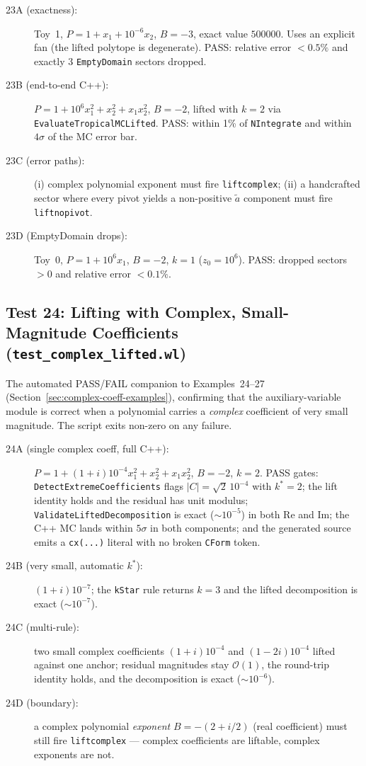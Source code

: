 \documentclass[11pt,a4paper]{article}
\begin{document}
\begin{description}
  \item[23A (exactness):] Toy~1, $P = 1 + x_1 + 10^{-6} x_2$, $B = -3$, exact value $500000$. Uses an explicit fan (the lifted polytope is degenerate). PASS: relative error $< 0.5\%$ and exactly 3 \texttt{EmptyDomain} sectors dropped.
  \item[23B (end-to-end C++):] $P = 1 + 10^6 x_1^2 + x_2^2 + x_1 x_2^2$, $B = -2$, lifted with $k = 2$ via \texttt{EvaluateTropicalMCLifted}. PASS: within 1\% of \texttt{NIntegrate} and within $4\sigma$ of the MC error bar.
  \item[23C (error paths):] (i) complex polynomial exponent must fire \texttt{liftcomplex}; (ii) a handcrafted sector where every pivot yields a non-positive $\tilde{a}$ component must fire \texttt{liftnopivot}.
  \item[23D (EmptyDomain drops):] Toy~0, $P = 1 + 10^6 x_1$, $B = -2$, $k = 1$ ($z_0 = 10^6$). PASS: dropped sectors $> 0$ and relative error $< 0.1\%$.
\end{description}

\subsection{Test 24: Lifting with Complex, Small-Magnitude Coefficients (\texttt{test\_complex\_lifted.wl})}\label{sec:test24}

The automated PASS/FAIL companion to Examples~24--27 (Section~\ref{sec:complex-coeff-examples}), confirming that the auxiliary-variable module is correct when a polynomial carries a \emph{complex} coefficient of very small magnitude. The script exits non-zero on any failure.

\begin{description}
  \item[24A (single complex coeff, full C++):] $P = 1 + (1{+}i)10^{-4} x_1^2 + x_2^2 + x_1 x_2^2$, $B = -2$, $k = 2$. PASS gates: \texttt{DetectExtremeCoefficients} flags $|C| = \sqrt{2}\,10^{-4}$ with $k^{*} = 2$; the lift identity holds and the residual has unit modulus; \texttt{ValidateLiftedDecomposition} is exact ($\sim$$10^{-5}$) in both Re and Im; the C++ MC lands within $5\sigma$ in both components; and the generated source emits a \texttt{cx(...)} literal with no broken \texttt{CForm} token.
  \item[24B (very small, automatic $k^{*}$):] $(1{+}i)10^{-7}$; the \texttt{kStar} rule returns $k = 3$ and the lifted decomposition is exact ($\sim$$10^{-7}$).
  \item[24C (multi-rule):] two small complex coefficients $(1{+}i)10^{-4}$ and $(1{-}2i)10^{-4}$ lifted against one anchor; residual magnitudes stay $\mathcal{O}(1)$, the round-trip identity holds, and the decomposition is exact ($\sim$$10^{-6}$).
  \item[24D (boundary):] a complex polynomial \emph{exponent} $B = -(2{+}i/2)$ (real coefficient) must still fire \texttt{liftcomplex} --- complex coefficients are liftable, complex exponents are not.
\end{description}
\end{document}
